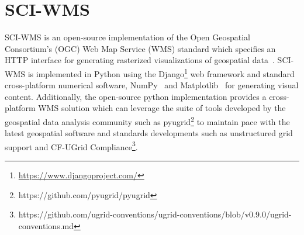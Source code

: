 \documentclass[11pt,twocolumn,twoside]{IEEEtran}
\newcommand{\ogc}{OGC}
\newcommand{\wms}{WMS}
\newcommand{\sciwms}{SCI-WMS}
\newcommand{\Sciwms}{SCI-WMS}
\begin{document}
\section{\sciwms{}}
\Sciwms{} is an open-source implementation of the Open Geospatial
Consortium's (\ogc{}) Web Map Service (\wms{}) standard which
specifies an HTTP interface for generating rasterized visualizations
of geospatial data~\cite{wms14}. \sciwms{} is implemented in Python
using the Django\footnote{\url{https://www.djangoproject.com/}} web
framework and standard cross-platform numerical software,
NumPy~\cite{numpy11} and Matplotlib~\cite{hunter07} for generating
visual content. Additionally, the open-source python implementation
provides a cross-platform \wms{} solution which can leverage the suite
of tools developed by the geospatial data analysis community such as
pyugrid\footnote{https://github.com/pyugrid/pyugrid} to maintain pace
with the latest geospatial software and standards developments such as
unstructured grid support and CF-UGrid
Compliance\footnote{https://github.com/ugrid-conventions/ugrid-conventions/blob/v0.9.0/ugrid-conventions.md}.
\end{document}
